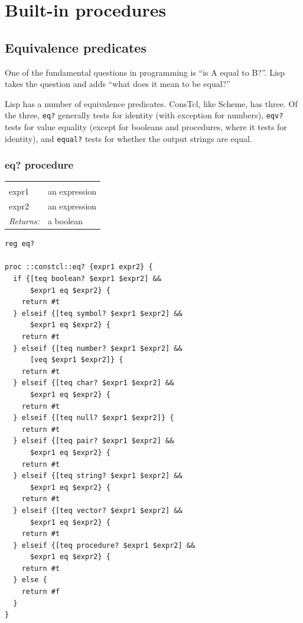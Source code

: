 \documentclass[twoside]{report}
\begin{document}
\chapter{Built-in procedures}
\label{builtin-procedures}

\section{Equivalence predicates}
\label{equivalence-predicates}

One of the fundamental questions in programming is ``is A equal to B?''. Lisp takes the question and adds ``what does it mean to be equal?''

Lisp has a number of equivalence predicates. ConsTcl, like Scheme, has three. Of the three, \texttt{eq?} generally tests for identity (with exception for numbers), \texttt{eqv?} tests for value equality (except for booleans and procedures, where it tests for identity), and \texttt{equal?} tests for whether the output strings are equal.

\subsection{eq? procedure}
\label{eq-procedure}

\noindent\begin{tabular}{ |p{1.9cm} p{8cm}| }
\hline
\rowcolor[HTML]{CCCCCC} \multicolumn{2}{|l|}{\bf eq?, eqv?, equal? (public)} \\
expr1 & an expression \\
expr2 & an expression \\
\textit{Returns:} & a boolean \\
\hline
\end{tabular}

\begin{lstlisting}
reg eq?

proc ::constcl::eq? {expr1 expr2} {
  if {[teq boolean? $expr1 $expr2] &&
      $expr1 eq $expr2} {
    return #t
  } elseif {[teq symbol? $expr1 $expr2] &&
      $expr1 eq $expr2} {
    return #t
  } elseif {[teq number? $expr1 $expr2] &&
      [veq $expr1 $expr2]} {
    return #t
  } elseif {[teq char? $expr1 $expr2] &&
      $expr1 eq $expr2} {
    return #t
  } elseif {[teq null? $expr1 $expr2]} {
    return #t
  } elseif {[teq pair? $expr1 $expr2] &&
      $expr1 eq $expr2} {
    return #t
  } elseif {[teq string? $expr1 $expr2] &&
      $expr1 eq $expr2} {
    return #t
  } elseif {[teq vector? $expr1 $expr2] &&
      $expr1 eq $expr2} {
    return #t
  } elseif {[teq procedure? $expr1 $expr2] &&
      $expr1 eq $expr2} {
    return #t
  } else {
    return #f
  }
}
\end{lstlisting}
\end{document}
